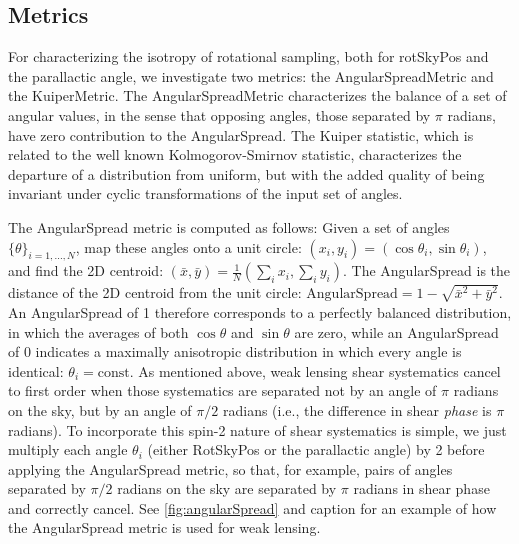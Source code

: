 \subsection{Metrics}


For characterizing the isotropy of rotational sampling, both for rotSkyPos and
the parallactic angle, we investigate two metrics: the AngularSpreadMetric and
the KuiperMetric.  The AngularSpreadMetric characterizes the balance of a set of
angular values, in the sense that opposing angles, those separated by $\pi$
radians, have zero contribution to the AngularSpread.  The Kuiper statistic,
which is related to the well known Kolmogorov-Smirnov statistic, characterizes
the departure of a distribution from uniform, but with the added quality of
being invariant under cyclic transformations of the input set of angles.

The AngularSpread metric is computed as follows:  Given a set of angles
$\{\theta\}_{i=1, ..., N}$, map these angles onto a unit circle: $(x_i, y_i) =
(\cos \theta_i, \sin \theta_i)$, and find the 2D centroid: $(\bar{x}, \bar{y}) =
\frac{1}{N} (\sum_i x_i, \sum_i y_i)$.  The AngularSpread is the distance of the
2D centroid from the unit circle: $\mathrm{AngularSpread} = 1 - \sqrt{\bar{x}^2 +
\bar{y}^2}$.  An AngularSpread of 1 therefore corresponds to a perfectly
balanced distribution, in which the averages of both $\cos \theta$ and $\sin
\theta$ are zero, while an AngularSpread of 0 indicates a maximally anisotropic
distribution in which every angle is identical: $\theta_i = \mathrm{const}$.  As
mentioned above, weak lensing shear systematics cancel to first order when those
systematics are separated not by an angle of $\pi$ radians on the sky, but by an
angle of $\pi/2$ radians (i.e., the difference in shear \emph{phase} is $\pi$
radians).  To incorporate this spin-2 nature of shear systematics is simple, we
just multiply each angle $\theta_i$ (either RotSkyPos or the parallactic angle)
by 2 before applying the AngularSpread metric, so that, for example, pairs of
angles separated by $\pi/2$ radians on the sky are separated by $\pi$ radians in
shear phase and correctly cancel.  See \autoref{fig:angularSpread} and caption for
an example of how the AngularSpread metric is used for weak lensing.


